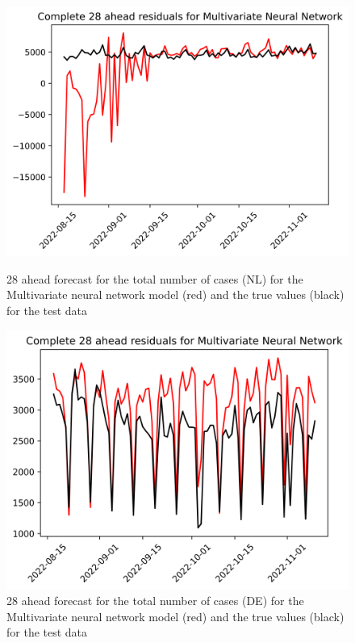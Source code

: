 \begin{figure}

\begin{minipage}{.32\textwidth}
  \centering
  \includegraphics[width=\linewidth]{pics/28_ah/Complete_28_ahead_Multivariate Neural Network.png}
  \caption{28 ahead forecast for the total number of cases (NL) for the Multivariate neural network model (red) and the true values (black) for the test data}
  \label{fig:tot_cases_fc_28_mvnn}
\end{minipage}
\begin{minipage}{.32\textwidth}
  \centering
  \includegraphics[width=\linewidth]{pics/28_ah/DE_Complete_28_ahead_Multivariate Neural Network.png}
  \caption{28 ahead forecast for the total number of cases (DE) for the Multivariate neural network model (red) and the true values (black) for the test data}

\end{minipage}
\end{figure}
